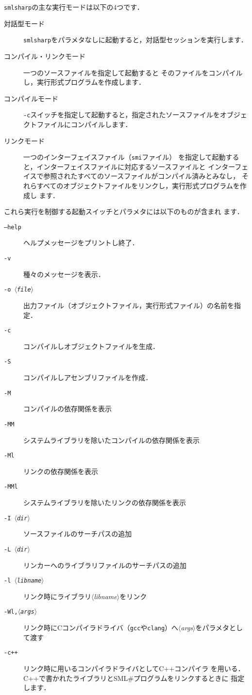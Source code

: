 \documentclass{jbook}
\newif\ifjp
\newcommand{\smlsharp}{SML\#}
\newcommand{\nonterm}[1]{\mbox{$\langle$}{\it #1}\mbox{$\rangle$}}
\begin{document}
\ifjp%
	{\tt smlsharp}の主な実行モードは以下の4つです．
\begin{description}
\item[対話型モード]
{\tt smlsharp}をパラメタなしに起動すると，対話型セッションを実行します．
\item[コンパイル・リンクモード]
一つのソースファイルを指定して起動すると
そのファイルをコンパイルし，実行形式プログラムを作成します．
\item[コンパイルモード]
{\tt -c}スイッチを指定して起動すると，指定されたソースファイルをオブジェ
クトファイルにコンパイルします．
\item[リンクモード]
一つのインターフェイスファイル（{\tt smi}ファイル）
を指定して起動すると，インターフェイスファイルに対応するソースファイルと
インターフェイスで参照されたすべてのソースファイルがコンパイル済みとみなし，
それらすべてのオブジェクトファイルをリンクし，実行形式プログラムを作成し
ます．
\end{description}
	これら実行を制御する起動スイッチとパラメタには以下のものが含まれ
ます．
\begin{description}
\item[{\tt --help}] ヘルプメッセージをプリントし終了．
\item[{\tt -v}] 種々のメッセージを表示．
\item[{\tt -o \nonterm{file}}] 出力ファイル（オブジェクトファイル，実行形式ファイル）の名前を指定．
\item[{\tt -c}]  コンパイルしオブジェクトファイルを生成．
\item[{\tt -S}]  コンパイルしアセンブリファイルを作成．
\item[{\tt -M}] コンパイルの依存関係を表示
\item[{\tt -MM}] システムライブラリを除いたコンパイルの依存関係を表示
\item[{\tt -Ml}] リンクの依存関係を表示
\item[{\tt -MMl}] システムライブラリを除いたリンクの依存関係を表示
\item[{\tt -I \nonterm{dir}}] ソースファイルのサーチパスの追加
\item[{\tt -L \nonterm{dir}}] リンカーへのライブラリファイルのサーチパスの追加
\item[{\tt -l \nonterm{libname}}] リンク時にライブラリ\nonterm{libname}をリンク
\item[{\tt -Wl,\nonterm{args}}]  リンク時にCコンパイラドライバ（{\tt gcc}や{\tt clang}）へ\nonterm{args}をパラメタとして渡す
\item[{\tt -c++}] リンク時に用いるコンパイラドライバとしてC++コンパイラ
を用いる．
C++で書かれたライブラリと\smlsharp{}プログラムをリンクするときに
指定します．
\end{description}
\end{document}
